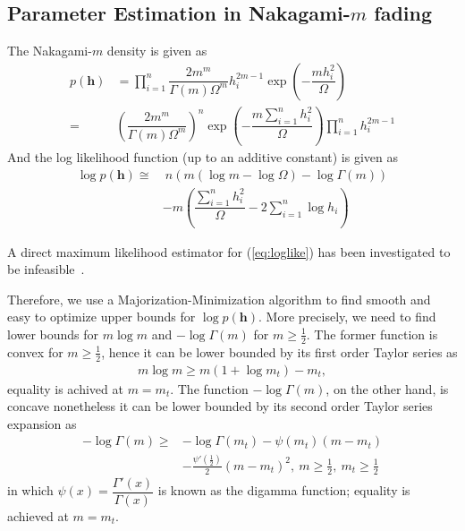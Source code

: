 \documentclass[conference, 10pt]{IEEEtran}
\begin{document}
\subsection{Parameter Estimation in Nakagami-$m$ fading}
The Nakagami-$m$ density is given as
\begin{align}
    p(\bm{h})& = \prod_{i=1}^{n}\dfrac{2m^m}{\Gamma(m)\Omega^{m}}h_i^{2m - 1}
              \exp\left(-\dfrac{mh_i^2}{\Omega}\right) \nonumber \\
          = & \left(\dfrac{2m^m}{\Gamma(m)\Omega^{m}}\right)^{n}
          \exp\left(-\dfrac{m\sum_{i=1}^{n}h_i^2}{\Omega}\right) \prod_{i=1}^{n}h_i^{2m - 1}
\end{align}
And the log likelihood function (up to an additive constant) is given as
\begin{align}
\log p(\bm{h}) \cong &~n\left(m\left(\log m - \log\Omega\right) - \log\Gamma(m)\right)\nonumber
    \\ & -m\left(\dfrac{\sum_{i=1}^{n}h_i^2}{\Omega} - 2\sum_{i=1}^{n}\log h_i\right)
    \label{eq:loglike}
\end{align}

A direct maximum likelihood estimator for (\ref{eq:loglike}) has been
investigated to be infeasible~\cite{paper}.

Therefore, we use a Majorization-Minimization algorithm to find smooth
and easy to optimize upper bounds for $\log p(\bm{h})$. More precisely,
we need to find lower bounds for $m\log m$ and $-\log \Gamma(m)$ for $m \geq \frac{1}{2}$.
The former function is convex for $m \geq \frac{1}{2}$, hence it can be lower bounded
by its first order Taylor series as
\begin{align}
    m \log m \geq m(1 + \log m_t) - m_t,
    \label{eq:lower-bound-mlogm}
\end{align}
equality is achived at $m = m_t$. The function $-\log \Gamma(m)$, on the other hand,
is concave nonetheless it can be lower bounded by its second order Taylor series expansion
as
\begin{align}
    -\log \Gamma(m) \geq& - \log \Gamma(m_t) - \psi(m_t) (m - m_t)\nonumber\\
                        & - \frac{\psi'\left(\frac{1}{2}\right)}{2}(m - m_t) ^ 2,
                        ~m \geq \frac{1}{2},~m_t \geq \frac{1}{2}
    \label{eq:lower-bound-negloggamma}
\end{align}
in which $\psi(x) = \dfrac{\Gamma'(x)}{\Gamma(x)}$ is known as the digamma function;
equality is achieved at $m = m_t$.
\end{document}
